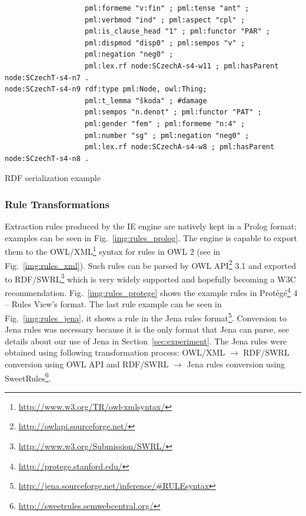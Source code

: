 \begin{listing}[ht]
\begin{verbatim}
                   pml:formeme "v:fin" ; pml:tense "ant" ;
                   pml:verbmod "ind" ; pml:aspect "cpl" ;
                   pml:is_clause_head "1" ; pml:functor "PAR" ;
                   pml:dispmod "disp0" ; pml:sempos "v" ;
                   pml:negation "neg0" ;
                   pml:lex.rf node:SCzechA-s4-w11 ; pml:hasParent node:SCzechT-s4-n7 .
node:SCzechT-s4-n9 rdf:type pml:Node, owl:Thing;
                   pml:t_lemma "škoda" ; #damage
                   pml:sempos "n.denot" ; pml:functor "PAT" ;
                   pml:gender "fem" ; pml:formeme "n:4" ;
                   pml:number "sg" ; pml:negation "neg0" ;
                   pml:lex.rf node:SCzechA-s4-w8 ; pml:hasParent node:SCzechT-s4-n8 .
\end{verbatim}
\caption{RDF serialization example}
\label{lst:rdf_serialization}
\end{listing}






\subsubsection{Rule Transformations}

Extraction rules produced by the IE engine are natively kept in a Prolog format; examples can be seen in Fig.~\ref{img:rules_prolog}. The engine is capable to export them to the OWL/XML\footnote{\url{http://www.w3.org/TR/owl-xmlsyntax/}} syntax for rules in OWL 2 \citep{GHPP09a} (see in Fig.~\ref{img:rules_xml}). Such rules can be parsed by OWL API\footnote{\url{http://owlapi.sourceforge.net/}} 3.1
and exported to RDF/SWRL\footnote{\url{http://www.w3.org/Submission/SWRL/}} which is very widely supported and hopefully becoming a W3C recommendation.
Fig.~\ref{img:rules_protege} shows the example rules in Prot\'{e}g\'{e}\footnote{\url{http://protege.stanford.edu/}} 4 -- Rules View's format. The last rule example can be seen in Fig.~\ref{img:rules_jena}, it shows a rule in the Jena rules format\footnote{\url{http://jena.sourceforge.net/inference/#RULEsyntax}}. Conversion to Jena rules was necessary because it is the only format that Jena can parse, see details about our use of Jena in Section~\ref{sec:experiment}. The Jena rules were obtained using following transformation process: OWL/XML $\rightarrow$ RDF/SWRL conversion using OWL API and RDF/SWRL $\rightarrow$ Jena rules conversion using SweetRules\footnote{\url{http://sweetrules.semwebcentral.org/}}.

